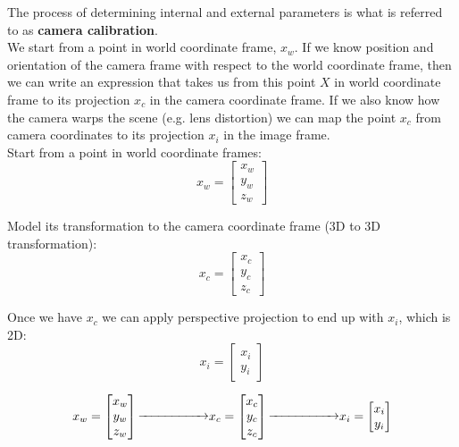 \documentclass{article}
\begin{document}
The process of determining internal and external parameters is what is referred to as \textbf{camera calibration}. \\

We start from a point in world coordinate frame, $x_w$. If we know position and orientation of the camera frame with respect to the world coordinate frame, then we can write an expression that takes us from this point $X$ in world coordinate frame to its projection $x_c$ in the camera coordinate frame. If we also know how the camera warps the scene (e.g. lens distortion) we can map the point $x_c$ from camera coordinates to its projection $x_i$ in the image frame. \\

Start from a point in world coordinate frames:
\begin{equation*}
    x_w = 
    \begin{bmatrix}
    x_w \\ 
    y_w \\ 
    z_w
    \end{bmatrix}
\end{equation*}

Model its transformation to the camera coordinate frame (3D to 3D transformation):
\begin{equation*}
    x_c = 
    \begin{bmatrix}
        x_c \\
        y_c \\
        z_c
    \end{bmatrix}
\end{equation*}

Once we have $x_c$ we can apply perspective projection to end up with $x_i$, which is 2D:
\begin{equation*}
    x_i = 
    \begin{bmatrix}
        x_i \\
        y_i
    \end{bmatrix}
\end{equation*}

\newpage

\begin{equation*}
    x_w = 
    \begin{bmatrix}
    x_w \\ 
    y_w \\ 
    z_w
    \end{bmatrix}
    \parbox{2cm}{\rightarrowfill}
    x_c = 
    \begin{bmatrix}
        x_c \\
        y_c \\
        z_c
    \end{bmatrix}
    \parbox{2cm}{\rightarrowfill}
    x_i = \begin{bmatrix}
        x_i \\
        y_i
    \end{bmatrix}
\end{equation*}
\end{document}

